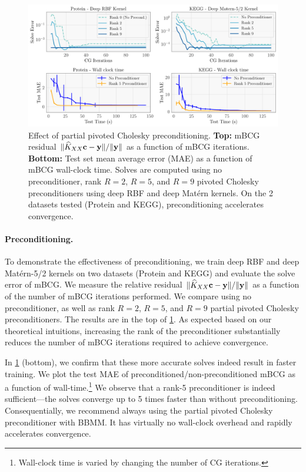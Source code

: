 \begin{figure}[t]
  \centering
  \includegraphics[width=\textwidth]{figures/precond_solves}
  \caption[Effect of partial pivoted Cholesky preconditioning on mBCG solve errors.]{
    Effect of partial pivoted Cholesky preconditioning.
		{\bf Top:} mBCG residual $\Vert \widehat{K}_{XX} \mathbf{c} - \mathbf{y} \Vert / \Vert \mathbf{y} \Vert$ as a function of mBCG iterations.
    {\bf Bottom:} Test set mean average error (MAE) as a function of mBCG wall-clock time.
		Solves are computed using no preconditioner, rank $R=2$, $R=5$, and $R=9$ pivoted Cholesky preconditioners using deep RBF and deep Mat\'ern kernels.
		On the 2 datasets tested (Protein and KEGG), preconditioning accelerates convergence.
  }
  \label{fig:precond_results}
\end{figure}

\paragraph{Preconditioning.}
To demonstrate the effectiveness of preconditioning,
we train deep RBF and deep Mat\'ern-5/2 kernels on two datasets (Protein and KEGG) and evaluate the solve error of mBCG.
We measure the relative residual $\Vert \widehat{K}_{XX}\mathbf{c} - \mathbf{y} \Vert / \Vert \mathbf{y} \Vert$ as a function of the number of mBCG iterations performed.
We compare using no preconditioner, as well as rank $R=2$, $R=5$, and $R=9$ partial pivoted Cholesky preconditioners.
The results are in the top of \cref{fig:precond_results}.
As expected based on our theoretical intuitions, increasing the rank of the preconditioner substantially reduces the number of mBCG iterations required to achieve convergence.

In \cref{fig:precond_results} (bottom), we confirm that these more accurate solves indeed result in faster training.
We plot the test MAE of preconditioned/non-preconditioned mBCG as a function of wall-time.\footnote{
  Wall-clock time is varied by changing the number of CG iterations.
}
We observe that a rank-5 preconditioner is indeed sufficient---the solves converge up to 5 times faster than without preconditioning.
Consequentially, we recommend always using the partial pivoted Cholesky preconditioner with BBMM.
It has virtually no wall-clock overhead and rapidly accelerates convergence.
